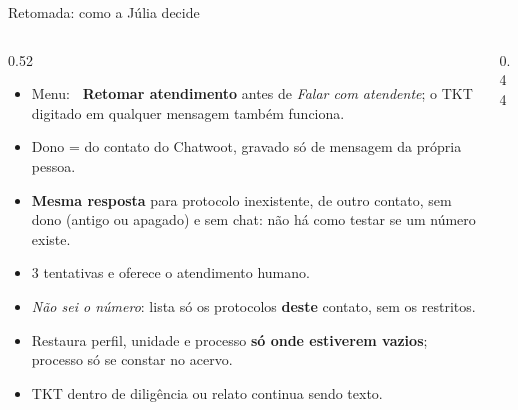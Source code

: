 \documentclass[aspectratio=169,10pt]{beamer}
\newcommand{\code}[1]{\texttt{\detokenize{#1}}}
\begin{document}
\begin{frame}{Retomada: como a Júlia decide}
\begin{columns}[T]
\begin{column}{0.52\textwidth}
\begin{itemize}\setlength\itemsep{4pt}\scriptsize
  \item Menu: \textbf{\faHistory\ Retomar atendimento} antes de \emph{Falar com atendente}; o TKT digitado em qualquer mensagem também funciona.
  \item Dono = \code{sender.id} do contato do Chatwoot, gravado só de mensagem da própria pessoa.
  \item \textbf{Mesma resposta} para protocolo inexistente, de outro contato, sem dono (antigo ou apagado) e sem chat: não há como testar se um número existe.
  \item 3 tentativas e oferece o atendimento humano.
  \item \emph{Não sei o número}: lista só os protocolos \textbf{deste} contato, sem os restritos.
  \item Restaura perfil, unidade e processo \textbf{só onde estiverem vazios}; processo só se constar no acervo.
  \item TKT dentro de diligência ou relato continua sendo texto.
\end{itemize}
\end{column}
\begin{column}{0.44\textwidth}
\end{column}
\end{columns}
\end{frame}
\end{document}
